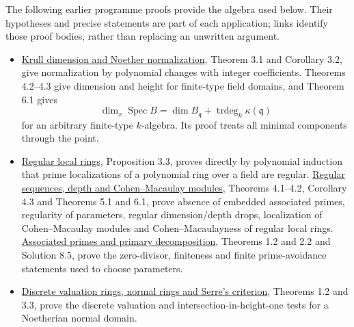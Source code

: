 \documentclass[11pt,a4paper,openany]{report}
\providecommand{\tightlist}{\setlength{\itemsep}{0pt}\setlength{\parskip}{0pt}}
\begin{document}
The following earlier programme proofs provide the algebra used below. Their hypotheses and precise statements are part of each application; links identify those proof bodies, rather than replacing an unwritten argument.

\begin{itemize}
\tightlist
\item
  \href{https://github.com/KokunoYumeto/open-math-courses/blob/d02d0a3669f42579db037cd44de1d113fdd770a1/docs/courses/AG-CA/src/krull-dimension-and-noether-normalization.md}{Krull dimension and Noether normalization}, Theorem 3.1 and Corollary 3.2, give normalization by polynomial changes with integer coefficients. Theorems 4.2--4.3 give dimension and height for finite-type field domains, and Theorem 6.1 gives \[
  \dim_x\operatorname{Spec}B=\dim B_{\mathfrak q}
     +\operatorname{trdeg}_k\kappa(\mathfrak q)
  \tag{1}
  \] for an arbitrary finite-type \(k\)-algebra. Its proof treats all minimal components through the point.
\item
  \href{https://github.com/KokunoYumeto/open-math-courses/blob/d02d0a3669f42579db037cd44de1d113fdd770a1/docs/courses/AG-CA/src/regular-local-rings.md}{Regular local rings}, Proposition 3.3, proves directly by polynomial induction that prime localizations of a polynomial ring over a field are regular. \href{https://github.com/KokunoYumeto/open-math-courses/blob/d02d0a3669f42579db037cd44de1d113fdd770a1/docs/courses/AG-CA/src/regular-sequences-depth-and-cohen-macaulay-modules.md}{Regular sequences, depth and Cohen--Macaulay modules}, Theorems 4.1--4.2, Corollary 4.3 and Theorems 5.1 and 6.1, prove absence of embedded associated primes, regularity of parameters, regular dimension/depth drops, localization of Cohen--Macaulay modules and Cohen--Macaulayness of regular local rings. \href{https://github.com/KokunoYumeto/open-math-courses/blob/d02d0a3669f42579db037cd44de1d113fdd770a1/docs/courses/AG-CA/src/associated-primes-and-primary-decomposition.md}{Associated primes and primary decomposition}, Theorems 1.2 and 2.2 and Solution 8.5, prove the zero-divisor, finiteness and finite prime-avoidance statements used to choose parameters.
\item
  \href{https://github.com/KokunoYumeto/open-math-courses/blob/d02d0a3669f42579db037cd44de1d113fdd770a1/docs/courses/AG-CA/src/discrete-valuation-rings-normal-rings-and-serres-criterion.md}{Discrete valuation rings, normal rings and Serre's criterion}, Theorems 1.2 and 3.3, prove the discrete valuation and intersection-in-height-one tests for a Noetherian normal domain.

\end{itemize}
\end{document}

